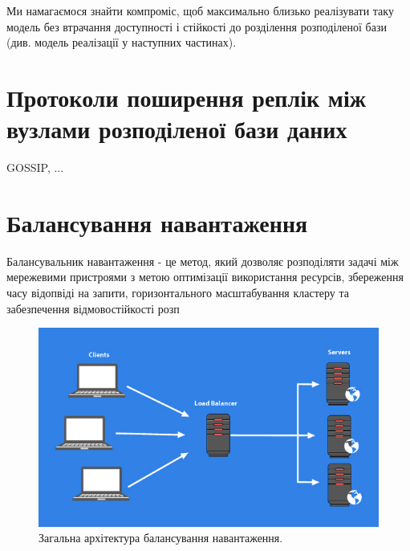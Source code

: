 \documentclass[14pt]{vakthesis}
\begin{document}
Ми намагаємося знайти компроміс, щоб максимально близько реалізувати таку модель без втрачання доступності і стійкості до розділення розподіленої бази (див. модель реалізації  у наступних частинах).

\section{Протоколи поширення реплік між вузлами розподіленої бази даних}
GOSSIP, ...
\section{Балансування навантаження}

Балансувальник навантаження - це метод, який дозволяє розподіляти задачі між мережевими пристроями з метою оптимізації використання ресурсів, збереження часу відопвіді на запити, горизонтального масштабування кластеру та забезпечення відмовостійкості розп%
\begin{figure}
\centering
\includegraphics[width=\linewidth]{images/load-balancing-general.jpg}
     \caption{Загальна архітектура балансування навантаження.}
     \label{fig:lb_general}
\end{figure}
\end{document}
